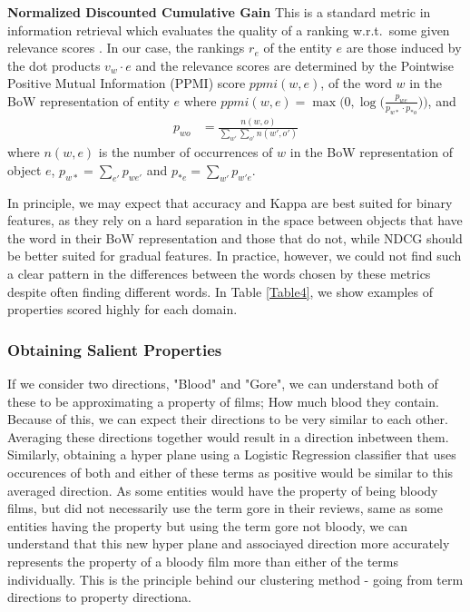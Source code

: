 \noindent \textbf{Normalized Discounted Cumulative Gain}
This is a standard metric in information retrieval which evaluates the quality of a ranking w.r.t.\ some given relevance scores \cite{jarvelin2002cumulated}.  In our case, the rankings $r_e$ of the entity $e$ are those induced by the dot products $v_w \cdot e$ and the relevance scores are determined by the Pointwise Positive Mutual Information (PPMI) score $\textit{ppmi}(w,e)$, of the word $w$ in the BoW representation of entity $e$ where
$\textit{ppmi}(w,e) = \max \big(0, \log\big(\frac{p_{we}}{p_{w*} \cdotp p_{*o}}\big)\big)$, and
\begin{align*}
p_{wo} &= \frac{n(w, o)}{\sum_{w'} \sum_{o'} n(w', o')}
\end{align*}
where $n(w,e)$ is the number of occurrences of $w$ in the BoW representation of object $e$, $p_{w*} = \sum_{e'} p_{we'}$ and $p_{*e} = \sum_{w'} p_{w'e}$. %
\smallskip

In principle, we may expect that accuracy and Kappa are best suited for binary features, as they rely on a hard separation in the space between objects that have the word in their BoW representation and those that do not, while NDCG should be better suited for gradual features. In practice, however, we could not find such a clear pattern in the differences between the words chosen by these metrics despite often finding different words. In Table \ref{Table4}, we show examples of properties scored highly for each domain.

\subsubsection{Obtaining Salient Properties}

If we consider two directions, "Blood" and "Gore", we can understand both of these to be approximating a property of films; How much blood they contain. Because of this, we can expect their directions to be very similar to each other. Averaging these directions together would result in a direction inbetween them. Similarly, obtaining a hyper plane using a Logistic Regression classifier that uses occurences of both and either of these terms as positive would be similar to this averaged direction. As some entities would have the property of being bloody films, but did not necessarily use the term gore in their reviews, same as some entities having the property but using the term gore not bloody, we can understand that this new hyper plane and associayed direction more accurately represents the property of a bloody film more than either of the terms individually. This is the principle behind our clustering method - going from term directions to property directiona.

